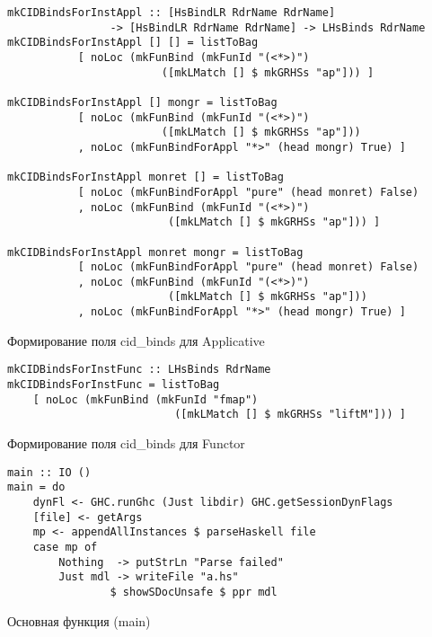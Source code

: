 \begin{ListingEnv}
\begin{lstlisting}
mkCIDBindsForInstAppl :: [HsBindLR RdrName RdrName]
                -> [HsBindLR RdrName RdrName] -> LHsBinds RdrName
mkCIDBindsForInstAppl [] [] = listToBag 
           [ noLoc (mkFunBind (mkFunId "(<*>)") 
                        ([mkLMatch [] $ mkGRHSs "ap"])) ]
                        
mkCIDBindsForInstAppl [] mongr = listToBag
           [ noLoc (mkFunBind (mkFunId "(<*>)") 
                        ([mkLMatch [] $ mkGRHSs "ap"]))
           , noLoc (mkFunBindForAppl "*>" (head mongr) True) ]
           
mkCIDBindsForInstAppl monret [] = listToBag
           [ noLoc (mkFunBindForAppl "pure" (head monret) False)
           , noLoc (mkFunBind (mkFunId "(<*>)") 
                         ([mkLMatch [] $ mkGRHSs "ap"])) ]
                         
mkCIDBindsForInstAppl monret mongr = listToBag
           [ noLoc (mkFunBindForAppl "pure" (head monret) False)
           , noLoc (mkFunBind (mkFunId "(<*>)") 
                         ([mkLMatch [] $ mkGRHSs "ap"]))
           , noLoc (mkFunBindForAppl "*>" (head mongr) True) ]
\end{lstlisting}
\caption{Формирование поля cid\_binds для Applicative}\label{cidbindsappl}
\end{ListingEnv}

\begin{ListingEnv}
\begin{lstlisting}
mkCIDBindsForInstFunc :: LHsBinds RdrName
mkCIDBindsForInstFunc = listToBag
    [ noLoc (mkFunBind (mkFunId "fmap") 
                          ([mkLMatch [] $ mkGRHSs "liftM"])) ]
\end{lstlisting}
\caption{Формирование поля cid\_binds для Functor}\label{cidbindsfunc}
\end{ListingEnv}

\begin{ListingEnv}
\begin{lstlisting}
main :: IO ()
main = do
    dynFl <- GHC.runGhc (Just libdir) GHC.getSessionDynFlags
    [file] <- getArgs
    mp <- appendAllInstances $ parseHaskell file
    case mp of
        Nothing  -> putStrLn "Parse failed"
        Just mdl -> writeFile "a.hs" 
                $ showSDocUnsafe $ ppr mdl
\end{lstlisting}
\caption{Основная функция (main)}\label{main}
\end{ListingEnv}

